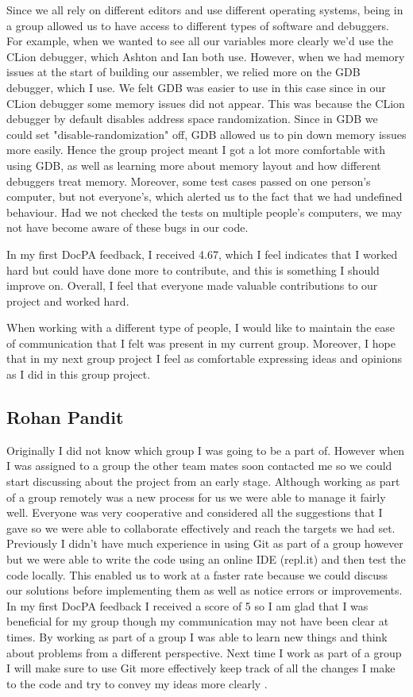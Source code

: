 \documentclass[11pt]{article}
\begin{document}
Since we all rely on different editors and use different operating systems, being in a group allowed us to have access to different types of software and debuggers. For example, when we wanted to see all our variables more clearly we'd use the CLion debugger, which Ashton and Ian both use. However, when we had memory issues at the start of building our assembler, we relied more on the GDB debugger, which I use. We felt GDB was easier to use in this case since in our CLion debugger some memory issues did not appear. This was because the CLion debugger by default disables address space randomization. Since in GDB we could set "disable-randomization" off, GDB allowed us to pin down memory issues more easily. Hence the group project meant I got a lot more comfortable with using GDB, as well as learning more about memory layout and how different debuggers treat memory. Moreover, some test cases passed on one person's computer, but not everyone's, which alerted us to the fact that we had undefined behaviour. Had we not checked the tests on multiple people's computers, we may not have become aware of these bugs in our code.

In my first DocPA feedback, I received 4.67, which I feel indicates that I worked hard but could have done more to contribute, and this is something I should improve on. Overall, I feel that everyone made valuable contributions to our project and worked hard.

When working with a different type of people, I would like to maintain the ease of communication that I felt was present in my current group. Moreover, I hope that in my next group project I feel as comfortable expressing ideas and opinions as I did in this group project.


\subsection*{Rohan Pandit}
Originally I did not know which group I was going to be a part of. However when I was assigned to a group the other team mates soon contacted me so we could start discussing about the project from an early stage. Although working as part of a group remotely was a new process for us we were able to manage it fairly well. Everyone was very cooperative and considered all the suggestions that I gave so we were able to collaborate effectively and reach the targets we had set. Previously I didn't have much experience in using Git as part of a group however but we were able to write the code using an online IDE (repl.it) and then test the code locally. This enabled us to work at a faster rate because we could discuss our solutions before implementing them as well as notice errors or improvements.
In my first DocPA feedback I received a score of 5 so I am glad that I was beneficial for my group though my communication may not have been clear at times. By working as part of a group I was able to learn new things and think about problems from a different perspective.
Next time I work as part of a group I will make sure to use Git more effectively keep track of all the changes I make to the code and try to convey my ideas more clearly .
\end{document}
